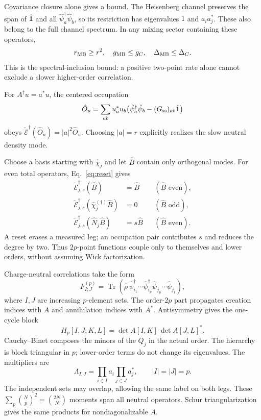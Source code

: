 \documentclass[aps,prb,twocolumn,10pt,raggedbottom,nofootinbib,superscriptaddress]{revtex4-2}
\newcommand{\Id}{\hat{\mathbf{1}}}
\newcommand{\Tr}{\operatorname{Tr}}
\newcommand{\E}{\widetilde{\mathcal E}}
\begin{document}
Covariance closure alone gives a bound. The Heisenberg channel
preserves the span of $\Id$ and all
$\hat\psi_a^\dagger\hat\psi_b$, so its restriction has eigenvalues
$1$ and $a_i a_j^*$. These also belong to the full channel spectrum.
In any mixing sector containing these operators,
\begin{equation}
 r_{\rm MB}\ge r^2,\quad g_{\rm MB}\le g_C,\quad
 \Delta_{\rm MB}\le\Delta_C.
 \label{eq:bound}
\end{equation}
This is the spectral-inclusion bound: a positive two-point rate alone
cannot exclude a slower higher-order correlation.

For $A^\dagger u=a^*u$, the centered occupation
\begin{equation}
 \hat O_u=\sum_{ab}u_a^*u_b
 \bigl(\hat\psi_a^\dagger\hat\psi_b-(G_{\rm ss})_{ab}\Id\bigr)
 \label{eq:densitymode}
\end{equation}
obeys $\E^\dagger(\hat O_u)=|a|^2\hat O_u$. Choosing $|a|=r$
explicitly realizes the slow neutral density mode.

Choose a basis starting with $\hat\chi_j$ and let $\hat B$ contain
only orthogonal modes. For even total operators, Eq.~\eqref{eq:reset} gives
\begin{align}
 \E_{j,s}^\dagger(\hat B)&=\hat B &&(\hat B\text{ even}),\nonumber\\
 \E_{j,s}^\dagger(\hat\chi_j^{(\dagger)}\hat B)&=0
 &&(\hat B\text{ odd}),\nonumber\\
 \E_{j,s}^\dagger(\hat N_j\hat B)&=s\hat B
 &&(\hat B\text{ even}). \label{eq:localrule}
\end{align}
A reset erases a measured leg; an occupation pair contributes $s$ and
reduces the degree by two. Thus $2p$-point functions couple only to
themselves and lower orders, without assuming Wick factorization.

Charge-neutral correlations take the form
\begin{equation}
 F_{I;J}^{(p)}=\Tr\!\left(\hat\rho\,
 \hat\psi_{i_1}^\dagger\cdots\hat\psi_{i_p}^\dagger
 \hat\psi_{j_p}\cdots\hat\psi_{j_1}\right), \label{eq:moments}
\end{equation}
where $I,J$ are increasing $p$-element sets. The order-$2p$ part
propagates creation indices with $A$ and annihilation indices with
$A^*$. Antisymmetry gives the one-cycle block
\begin{equation}
 H_p[I,J;K,L]=\det A[I,K]\,\det A[J,L]^*. \label{eq:Hp}
\end{equation}
Cauchy--Binet composes the minors of the $Q_j$ in the actual order.
The hierarchy is block triangular in $p$; lower-order terms do not
change its eigenvalues. The multipliers are
\begin{equation}
 \Lambda_{I,J}=\prod_{i\in I}a_i\prod_{j\in J}a_j^*,\qquad
 |I|=|J|=p. \label{eq:products}
\end{equation}
The independent sets may overlap, allowing the same label on both
legs. These $\sum_p\binom Np^2=\binom{2N}{N}$ moments span all neutral
operators. Schur triangularization gives the same products for
nondiagonalizable $A$.
\end{document}
